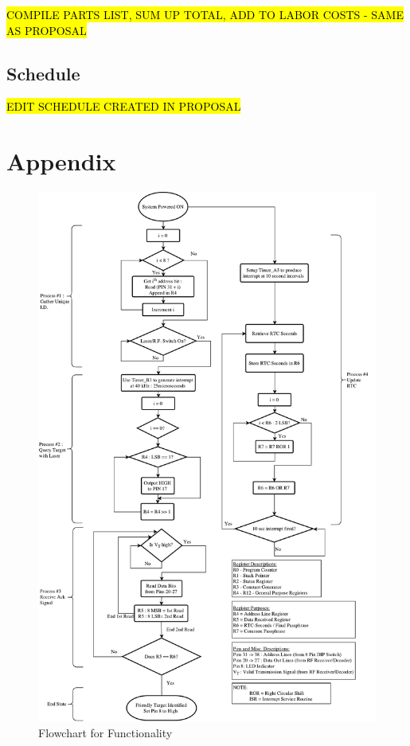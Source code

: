 \documentclass[letterpaper,10pt]{article}
\begin{document}
\begin{spacing}{1.15}
\hl{COMPILE PARTS LIST, SUM UP TOTAL, ADD TO LABOR COSTS - SAME AS PROPOSAL}

\subsection{Schedule}
\hl{EDIT SCHEDULE CREATED IN PROPOSAL}


\clearpage


\section*{Appendix}

\begin{figure} [H]
	\centering
	\includegraphics[scale=0.50]{Friendly_Interrogator_Software_Flowchart.pdf}
	\caption{Flowchart for Functionality\label{fig:friendly-interrogator-software-flowchart}}
\end{figure}

\end{spacing}
\end{document}
